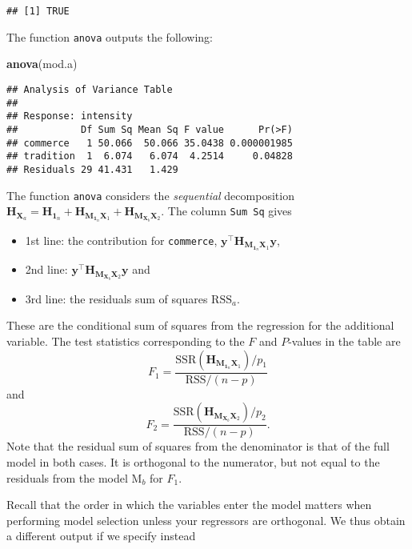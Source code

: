 \documentclass[]{book}
\newenvironment{Shaded}{\begin{snugshade}}{\end{snugshade}}
\newcommand{\KeywordTok}[1]{\textcolor[rgb]{0.13,0.29,0.53}{\textbf{#1}}}
\newcommand{\NormalTok}[1]{#1}
\providecommand{\tightlist}{%
  \setlength{\itemsep}{0pt}\setlength{\parskip}{0pt}}
\theoremstyle{definition}
\theoremstyle{definition}
\theoremstyle{definition}
\theoremstyle{remark}
\begin{document}
\begin{verbatim}
## [1] TRUE
\end{verbatim}

The function \texttt{anova} outputs the following:

\begin{Shaded}
\begin{Highlighting}[]
\KeywordTok{anova}\NormalTok{(mod.a)}
\end{Highlighting}
\end{Shaded}

\begin{verbatim}
## Analysis of Variance Table
## 
## Response: intensity
##           Df Sum Sq Mean Sq F value      Pr(>F)
## commerce   1 50.066  50.066 35.0438 0.000001985
## tradition  1  6.074   6.074  4.2514     0.04828
## Residuals 29 41.431   1.429
\end{verbatim}

The function \texttt{anova} considers the \emph{sequential} decomposition
\(\mathbf{H}_{\mathbf{X}_a}=\mathbf{H}_{\mathbf{1}_n} + \mathbf{H}_{\mathbf{M}_{\mathbf{1}_n}\mathbf{X}_1} + \mathbf{H}_{\mathbf{M}_{\mathbf{X}_b}\mathbf{X}_2}\).
The column \texttt{Sum\ Sq} gives

\begin{itemize}
\tightlist
\item
  1st line: the contribution for \texttt{commerce}, \(\boldsymbol{y}^\top\mathbf{H}_{\mathbf{M}_{\mathbf{1}_n}\mathbf{X}_1}\boldsymbol{y}\),
\item
  2nd line: \(\boldsymbol{y}^\top\mathbf{H}_{\mathbf{M}_{\mathbf{X}_b}\mathbf{X}_2}\boldsymbol{y}\) and
\item
  3rd line: the residuals sum of squares \(\mathrm{RSS}_a\).
\end{itemize}

These are the conditional sum of squares from the regression for the additional variable.
The test statistics corresponding to the \(F\) and \(P\)-values in the table are
\[F_1 = \frac{\mathrm{SSR}(\mathbf{H}_{\mathbf{M}_{\mathbf{1}_n}\mathbf{X}_1})/p_1}{\mathrm{RSS}/(n-p)}\]
and
\[F_2 = \frac{\mathrm{SSR}(\mathbf{H}_{\mathbf{M}_{\mathbf{X}_b}\mathbf{X}_2})/p_2}{\mathrm{RSS}/(n-p)}.\]
Note that the residual sum of squares from the denominator is that of the full model in both cases. It is orthogonal to the numerator, but not equal to the residuals from the model \(\mathrm{M}_b\) for \(F_1\).

Recall that the order in which the variables enter the model matters when performing model selection unless your regressors are orthogonal. We thus obtain a different output if we specify instead
\end{document}
